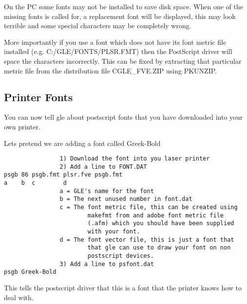 	On the PC some fonts may not be installed to save disk space.
When one of the missing fonts is  called for, a replacement 
font will be displayed, this may look
terrible and some special characters may be completely wrong.

\clearpage
More importantly if you use a font which does not have its font metric
file installed (e.g. C:/GLE/FONTS/PLSR.FMT) then the
PostScript driver will space the characters incorrectly.  This can 
be fixed by extracting that particular metric file from the 
distribution file CGLE\_FVE.ZIP using PKUNZIP. 

\subsection{Printer Fonts}
You can now tell gle about postscript fonts that you have 
downloaded into your own printer.

Lets pretend we are adding a font called Greek-Bold
\begin{verbatim}
                1) Download the font into you laser printer
                2) Add a line to FONT.DAT
psgb 86 psgb.fmt plsr.fve psgb.fmt
a    b  c        d
                a = GLE's name for the font
                b = The next unused number in font.dat
                c = The font metric file, this can be created using
                        makefmt from and adobe font metric file
                        (.afm) which you should have been supplied
                        with your font.
                d = The font vector file, this is just a font that
                        that gle can use to draw your font on non
                        postscript devices.
                3) Add a line to psfont.dat
psgb Greek-Bold
\end{verbatim}
This tells the postscript driver that this is a 
font that the printer knows how to deal with.
